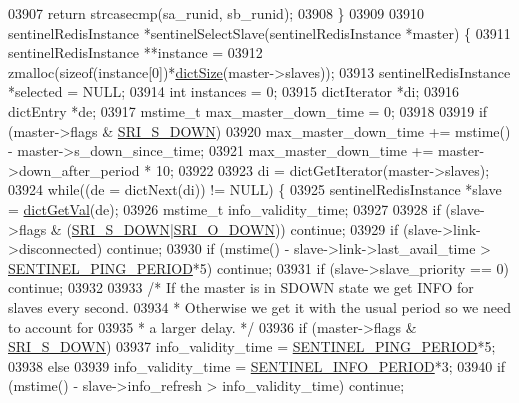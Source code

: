 \begin{DoxyCode}
{{{{{{{{{{{{{{{{{{{{{{{{{{{{{{{{{{{{{{{{{{{{{{{{{{{{{{{{{{{{{{{{{{{{{{{{{{{{{{{{{{{{{{{03907     \textcolor{keywordflow}{return} strcasecmp(sa\_runid, sb\_runid);
03908 \}
03909 
03910 sentinelRedisInstance *sentinelSelectSlave(sentinelRedisInstance *master) \{
03911     sentinelRedisInstance **instance =
03912         zmalloc(\textcolor{keyword}{sizeof}(instance[0])*\hyperlink{dict_8h_af193430dd3d5579a52b194512f72c1f0}{dictSize}(master->slaves));
03913     sentinelRedisInstance *selected = NULL;
03914     \textcolor{keywordtype}{int} instances = 0;
03915     dictIterator *di;
03916     dictEntry *de;
03917     mstime\_t max\_master\_down\_time = 0;
03918 
03919     \textcolor{keywordflow}{if} (master->flags & \hyperlink{sentinel_8c_a8e26596c8bde451c2dd9cecb2c3046d4}{SRI\_S\_DOWN})
03920         max\_master\_down\_time += mstime() - master->s\_down\_since\_time;
03921     max\_master\_down\_time += master->down\_after\_period * 10;
03922 
03923     di = dictGetIterator(master->slaves);
03924     \textcolor{keywordflow}{while}((de = dictNext(di)) != NULL) \{
03925         sentinelRedisInstance *slave = \hyperlink{dict_8h_ae8d2cc391873b2bea2b87c4f80f43120}{dictGetVal}(de);
03926         mstime\_t info\_validity\_time;
03927 
03928         \textcolor{keywordflow}{if} (slave->flags & (\hyperlink{sentinel_8c_a8e26596c8bde451c2dd9cecb2c3046d4}{SRI\_S\_DOWN}|\hyperlink{sentinel_8c_a3bbbca05543cd9d9f86d276e2c7c719c}{SRI\_O\_DOWN})) \textcolor{keywordflow}{continue};
03929         \textcolor{keywordflow}{if} (slave->link->disconnected) \textcolor{keywordflow}{continue};
03930         \textcolor{keywordflow}{if} (mstime() - slave->link->last\_avail\_time > \hyperlink{sentinel_8c_a9e22409355fa7a4db7f3a43fbe2d9101}{SENTINEL\_PING\_PERIOD}*5) \textcolor{keywordflow}{
      continue};
03931         \textcolor{keywordflow}{if} (slave->slave\_priority == 0) \textcolor{keywordflow}{continue};
03932 
03933         \textcolor{comment}{/* If the master is in SDOWN state we get INFO for slaves every second.}
03934 \textcolor{comment}{         * Otherwise we get it with the usual period so we need to account for}
03935 \textcolor{comment}{         * a larger delay. */}
03936         \textcolor{keywordflow}{if} (master->flags & \hyperlink{sentinel_8c_a8e26596c8bde451c2dd9cecb2c3046d4}{SRI\_S\_DOWN})
03937             info\_validity\_time = \hyperlink{sentinel_8c_a9e22409355fa7a4db7f3a43fbe2d9101}{SENTINEL\_PING\_PERIOD}*5;
03938         \textcolor{keywordflow}{else}
03939             info\_validity\_time = \hyperlink{sentinel_8c_ac6a2144aa06344ed8547176a4e3cfaa5}{SENTINEL\_INFO\_PERIOD}*3;
03940         \textcolor{keywordflow}{if} (mstime() - slave->info\_refresh > info\_validity\_time) \textcolor{keywordflow}{continue};
}}}}}}}}}}}}}}}}}}}}}}}}}}}}}}}}}}}}}}}}}}}}}}}}}}}}}}}}}}}}}}}}}}}}}}}}}}}}}}}}}}}}}}}
\end{DoxyCode}
